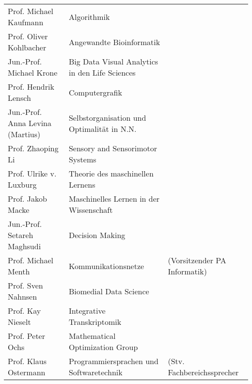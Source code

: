 \begin{tabular}{|lll|}
	Prof. Michael Kaufmann           & Algorithmik                                           &                                          \\
	Prof. Oliver Kohlbacher          & Angewandte Bioinformatik                              &                                          \\
	Jun.-Prof. Michael Krone         & Big Data Visual Analytics in den Life Sciences        &                                          \\
	Prof. Hendrik Lensch             & Computergrafik                                        &                                          \\
	Jun.-Prof. Anna Levina (Martius) & Selbstorganisation und Optimalität in N.N.            &                                          \\
	Prof. Zhaoping Li                & Sensory and Sensorimotor Systems                      &                                          \\
	Prof. Ulrike v. Luxburg          & Theorie des maschinellen Lernens                      &                                          \\
	Prof. Jakob Macke                & Maschinelles Lernen in der Wissenschaft               &                                          \\
	Jun.-Prof. Setareh Maghsudi      & Decision Making                                       &                                          \\
	Prof. Michael Menth              & Kommunikationsnetze                                   & (Vorsitzender PA Informatik)             \\
	Prof. Sven Nahnsen               & Biomedial Data Science                                &                                          \\
	Prof. Kay Nieselt                & Integrative Transkriptomik                            &                                          \\
	Prof. Peter Ochs								 & Mathematical Optimization Group											 &																					\\
	Prof. Klaus Ostermann            & Programmiersprachen und Softwaretechnik               & (Stv. Fachbereichssprecher               \\

\end{tabular}
